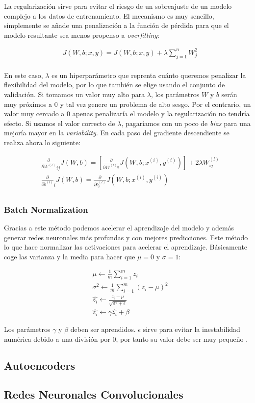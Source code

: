 La regularización sirve para evitar el riesgo de un sobreajuste de un modelo complejo a los datos de entrenamiento. El mecanismo es muy sencillo, simplemente se añade una penalización a la función de pérdida para que el modelo resultante sea menos propenso a \textit{overfitting}:

\begin{align*}
	&J(W,b;x,y) = J(W,b;x,y) + \lambda \sum_{j=1}^n W_j^2\\
\end{align*}

En este caso, $\lambda$ es un hiperparámetro que reprenta cuánto queremos penalizar la flexibilidad del modelo, por lo que también se elige usando el conjunto de validación. Si tomamos un valor muy alto para $\lambda$, los parámetros $W$ y $b$ serán muy próximos a 0 y tal vez genere un problema de alto sesgo. Por el contrario, un valor muy cercado a 0 apenas penalizaría el modelo y la regularización no tendría efecto. Si usamos el valor correcto de $\lambda$, pagaríamos con un poco de \textit{bias} para una mejoría mayor en la \textit{variability}. En cada paso del gradiente descendiente se realiza ahora lo siguiente:

\begin{align*}
	&\frac{\partial}{\partial W^{(l)}}_{ij} J(W,b) = \left[ \frac{\partial}{\partial W^{(l)_{ij}}} J(W,b;x^{(i)},y^{(i)}) \right] + 2 \lambda W^{(l)}_{ij}\\
	&\frac{\partial}{\partial b^{(l)}}_i J(W,b) = \frac{\partial}{\partial b^{(l)}_i} J(W,b;x^{(i)},y^{(i)})\\
\end{align*}

\subsubsection{Batch Normalization}

Gracias a este método podemos acelerar el aprendizaje del modelo y además generar redes neuronales más profundas y con mejores predicciones. Este método lo que hace normalizar las activaciones para acelerar el aprendizaje. Básicamente coge las varianza y la media para hacer que $\mu = 0$ y $\sigma = 1$:

\begin{align}
	&\mu \leftarrow \frac{1}{m} \sum_{i=1}^m z_i\\
	&\sigma^2 \leftarrow \frac{1}{m} \sum_{i=1}^m (z_i - \mu)^2\\
	&\hat{z_i} \leftarrow \frac{z_i - \mu}{\sqrt{\sigma ^ 2 + \epsilon}}\\
	&\hat{z_i} \leftarrow \gamma \hat{z_i} + \beta 
\end{align}

Los parámetros $\gamma$ y $\beta$ deben ser aprendidos. $\epsilon$ sirve para evitar la inestabilidad numérica debido a una división por 0, por tanto su valor debe ser muy pequeño \cite{DBLP:journals/corr/IoffeS15}.

\subsection{Autoencoders}

\subsection{Redes Neuronales Convolucionales}
